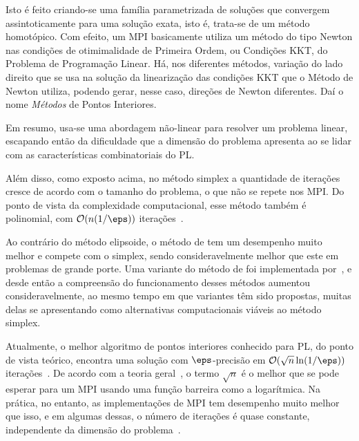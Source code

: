 Isto é feito criando-se uma família
parametrizada de soluções que convergem assintoticamente para uma solução exata,
isto é, trata-se de um método homotópico. Com efeito, um \ac{MPI} basicamente utiliza um método do tipo Newton nas condições de otimimalidade de Primeira Ordem, ou Condições KKT, do Problema de Programação Linear. Há, nos diferentes métodos, variação  do lado direito que se usa na solução da linearização das condições KKT que o Método de Newton utiliza, podendo gerar, nesse caso,  direções de Newton diferentes. Daí o nome \emph{Métodos} de Pontos Interiores. 

Em resumo, usa-se uma abordagem não-linear para resolver um problema
linear, escapando então da  dificuldade que a dimensão do problema apresenta ao
se lidar com as características combinatoriais  do \ac{PL}.


Além disso,  como exposto acima,  no método simplex a quantidade de
iterações cresce de acordo com o tamanho do problema,  o que não se repete
nos \ac{MPI}. Do ponto de vista
da complexidade computacional, esse método também é polinomial,  com
$\mathcal{O}(n(1/\eps))$ iterações~\cite{Karmarkar:1984cp}.
 
  
Ao contrário do método elipsoide, o método de \citeauthor{Karmarkar:1984cp} tem um desempenho muito
melhor e compete com o simplex, sendo consideravelmente melhor  que este em
problemas de grande porte. Uma variante do método de \citeauthor{Karmarkar:1984cp} foi implementada
por~\textcite{Adler:1989fw}, e desde então a compreensão do funcionamento desses
métodos aumentou consideravelmente, ao mesmo tempo em que variantes têm
sido propostas, muitas delas se apresentando como alternativas computacionais
viáveis ao método simplex.

Atualmente, o melhor algoritmo de pontos interiores conhecido para \ac{PL},  do ponto de vista teórico, 
encontra uma solução com $\eps$-precisão em $\Oset(\sqrt{n}\ln(1/\eps))$
iterações~\cite{Renegar:1988cr}.
De acordo com a teoria geral~\cite[Capítulo 4]{Nesterov:2003wi}, o termo
$\sqrt{n}$  é o melhor que se pode esperar para um \ac{MPI} usando uma função barreira como a
logarítmica. Na prática, no entanto, as implementações de \ac{MPI}  tem desempenho muito melhor que
isso, e em algumas dessas, o número de iterações é quase constante, independente da dimensão do
problema~\cite{Colombo:2008ia}.

